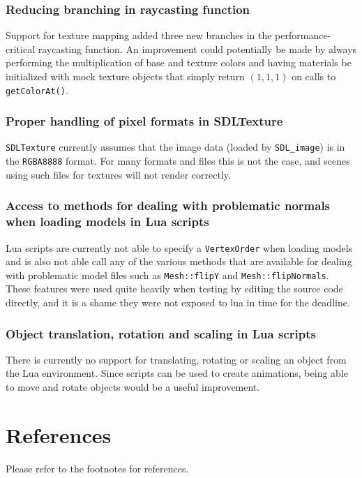 \documentclass[a4paper,11pt]{article}
\begin{document}
\subsubsection{Reducing branching in raycasting function}
Support for texture mapping added three new branches in the performance-critical raycasting
function. An improvement could potentially be made by always performing the multiplication
of base and texture colors and having materials be initialized with mock texture
objects that simply return $(1,1,1)$ on calls to \texttt{getColorAt()}.

\subsubsection{Proper handling of pixel formats in SDLTexture}
\texttt{SDLTexture} currently assumes that the image data (loaded by \texttt{SDL\_image}) is in the
\texttt{RGBA8888} format. For many formats and files this is not the case, and scenes using such files
for textures will not render correctly.

\subsubsection{Access to methods for dealing with problematic normals when loading models in Lua scripts}
Lua scripts are currently not able to specify a \texttt{VertexOrder} when loading models and is
also not able call any of the various methods that are available for dealing with problematic model
files such as \texttt{Mesh::flipY} and \texttt{Mesh::flipNormals}. These features were used quite heavily
when testing by editing the source code directly, and it is a shame they were not exposed to lua
in time for the deadline.

\subsubsection{Object translation, rotation and scaling in Lua scripts}
There is currently no support for translating, rotating or scaling an object from the
Lua environment. Since scripts can be used to create animations, being able to move
and rotate objects would be a useful improvement.

\section{References}
Please refer to the footnotes for references.


\end{document}
